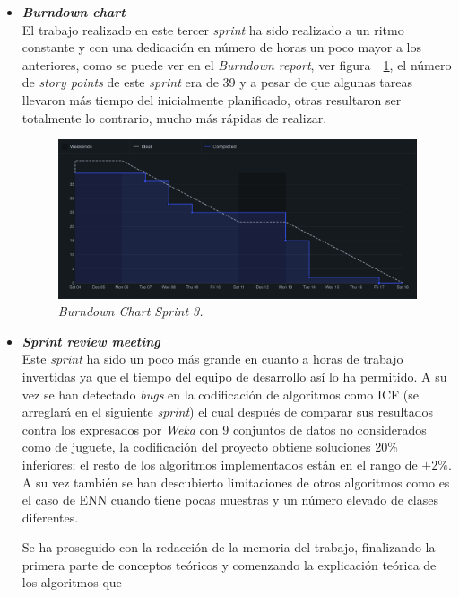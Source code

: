 \begin{itemize}
\item \textbf{\textit{Burndown chart}}\\
El trabajo realizado en este tercer \textit{sprint} ha sido realizado a un ritmo constante y con una dedicación en número de horas un poco mayor a los anteriores, como se puede ver en el \textit{Burndown report}, ver figura~~\ref{fig:BD-Sprint3}, el número de \textit{story points} de este \textit{sprint} era de 39 y a pesar de que algunas tareas llevaron más tiempo del inicialmente planificado, otras resultaron ser totalmente lo contrario, mucho más rápidas de realizar.
\begin{figure}
\begin{center}
\includegraphics[width=\textwidth]{../img/anexos/sprints/BD-Sprint3}
\caption{\textit{Burndown Chart Sprint 3.}}\label{fig:BD-Sprint3}
\end{center}
\end{figure}
\item \textbf{\textit{Sprint review meeting}}\\
Este \textit{sprint} ha sido un poco más grande en cuanto a horas de trabajo invertidas ya que el tiempo del equipo de desarrollo así lo ha permitido. A su vez se han detectado \textit{bugs} en la codificación de algoritmos como ICF (se arreglará en el siguiente \textit{sprint}) el cual después de comparar sus resultados contra los expresados por \textit{Weka} con 9 conjuntos de datos no considerados como de juguete, la codificación del proyecto obtiene soluciones 20\% inferiores; el resto de los algoritmos implementados están en el rango de $\pm2\%$. A su vez también se han descubierto limitaciones de otros algoritmos como es el caso de ENN cuando tiene pocas muestras y un número elevado de clases diferentes.

Se ha proseguido con la redacción de la memoria del trabajo, finalizando la primera parte de conceptos teóricos y comenzando la explicación teórica de los algoritmos que
\end{itemize}

